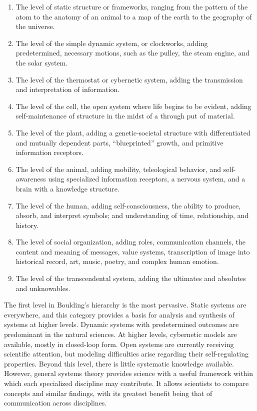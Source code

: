 \begin{enumerate}
\item The level of static structure or frameworks, ranging from the pattern of the atom to the anatomy of an animal to a map of the earth to the geography of the universe.
\item The level of the simple dynamic system, or clockworks, adding predetermined, necessary motions, such as the pulley, the steam engine, and the solar system.
\item The level of the thermostat or cybernetic system, adding the transmission and interpretation of information.
\item The level of the cell, the open system where life begins to be evident, adding self-maintenance of structure in the midst of a through put of material.
\item The level of the plant, adding a genetic-societal structure with differentiated and mutually dependent parts, “blueprinted” growth, and primitive information receptors.
\item The level of the animal, adding mobility, teleological behavior, and self-awareness using specialized information receptors, a nervous system, and a brain with a knowledge structure.
\item The level of the human, adding self-consciousness, the ability to produce, absorb, and interpret symbols; and understanding of time, relationship, and history.
\item The level of social organization, adding roles, communication channels, the content and meaning of messages, value systems, transcription of image into historical record, art, music, poetry, and complex human emotion.
\item The level of the transcendental system, adding the ultimates and absolutes and unknowables.
\end{enumerate}

The first level in Boulding’s hierarchy is the most pervasive. Static systems are everywhere, and this category provides a basis for analysis and synthesis of systems at higher levels. Dynamic systems with predetermined outcomes are predominant in the natural sciences. At higher levels, cybernetic models are available, mostly in closed-loop form. Open systems are currently receiving scientific attention, but modeling difficulties arise regarding their self-regulating properties. Beyond this level, there is little systematic knowledge available. However, general systems theory provides science with a useful framework within which each specialized discipline may contribute. It allows scientists to compare concepts and similar findings, with its greatest benefit being that of communication across disciplines.

